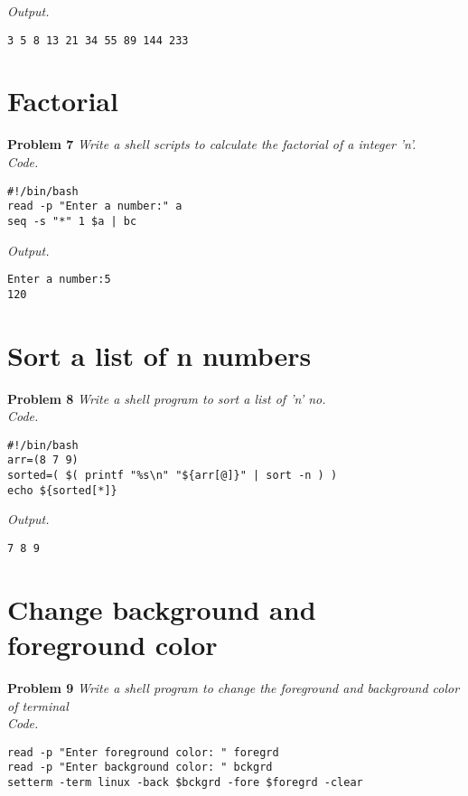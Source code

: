 \documentclass[12pt]{article}
\begin{document}
\textit{Output.}
\begin{lstlisting}
3 5 8 13 21 34 55 89 144 233
\end{lstlisting}

\section{Factorial}

\textbf{Problem 7} \textit{Write a shell scripts to calculate the factorial of a integer 'n'.}\\

\textit{Code.}

\begin{lstlisting}
#!/bin/bash
read -p "Enter a number:" a
seq -s "*" 1 $a | bc
\end{lstlisting}

\textit{Output.}
\begin{lstlisting}Enter a number:5
120
\end{lstlisting}

\section{Sort a list of n numbers}

\textbf{Problem 8} \textit{Write a shell program to sort a list of 'n' no.}\\

\textit{Code.}

\begin{lstlisting}
#!/bin/bash
arr=(8 7 9)
sorted=( $( printf "%s\n" "${arr[@]}" | sort -n ) )
echo ${sorted[*]}
\end{lstlisting}

\textit{Output.}
\begin{lstlisting}
7 8 9
\end{lstlisting}

\section{Change background and foreground color}

\textbf{Problem 9} \textit{Write a shell program to change the foreground and background color of terminal}\\

\textit{Code.}

\begin{lstlisting}
read -p "Enter foreground color: " foregrd
read -p "Enter background color: " bckgrd
setterm -term linux -back $bckgrd -fore $foregrd -clear
\end{lstlisting}
\end{document}

